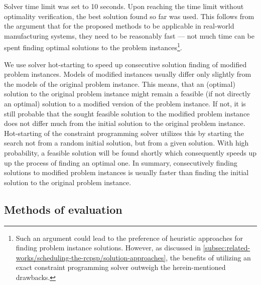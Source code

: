 Solver time limit was set to 10 seconds.
Upon reaching the time limit without optimality verification,
the best solution found so far was used.
This follows from the argument that for the proposed methods
to be applicable in real-world manufacturing systems,
they need to be reasonably fast
--- not much time can be spent finding optimal solutions to the problem instances\footnote{
    Such an argument could lead to the preference of heuristic approaches for finding problem instance solutions.
    However, as discussed in \cref{subsec:related-works/scheduling-the-rcpsp/solution-approaches},
    the benefits of utilizing an exact constraint programming solver outweigh the herein-mentioned drawbacks.
    }.

We use solver hot-starting to speed up consecutive solution finding of modified problem instances.
Models of modified instances usually differ only slightly from the models of the original problem instance.
This means, that an (optimal) solution to the original problem instance
might remain a feasible (if not directly an optimal) solution to a modified version of the problem instance.
If not, it is still probable that the sought feasible solution to the modified problem instance
does not differ much from the initial solution to the original problem instance.
Hot-starting of the constraint programming solver utilizes this
by starting the search not from a random initial solution, but from a given solution.
With high probability, a feasible solution will be found shortly
which consequently speeds up up the process of finding an optimal one.
In summary, consecutively finding solutions to modified problem instances is usually faster
than finding the initial solution to the original problem instance.

\subsection{Methods of evaluation} \label{subsec:numerical-experiments/setup/methods-of-evaluation}


